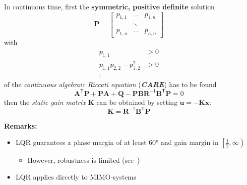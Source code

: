 In continuous time, first the \textbf{symmetric, positive definite} solution
\begin{equation*}
    \mathbf{P}=\begin{bmatrix} p_{1,1} & \dots  & p_{1,n} \\
                        & \ddots &         \\
                p_{1,n} & \dots  & p_{n,n}
    \end{bmatrix}
\end{equation*}
with
\begin{align*}
    p_{1,1}                   & >0 \\
    p_{1,1}p_{2,2} -p_{1,2}^2 & >0 \\
    \vdots
\end{align*}
of the \textit{continuous algebraic Riccati equation} (\textbf{\textit{CARE}}) has to be found
\noindent\begin{equation*}
    \mathbf{A}^{\mathsf{T}} \mathbf{P}+\mathbf{PA}+\mathbf{Q}-\mathbf{PBR}^{-1}\mathbf{B}^{\mathsf{T}} \mathbf{P}=0
\end{equation*}
then the \textit{static gain matrix} $\mathbf{K}$ can be obtained by setting $\mathbf{u} = -\mathbf{Kx}$:
\noindent\begin{equation*}
    \mathbf{K}=\mathbf{R}^{-1}\mathbf{B}^{\mathsf{T}} \mathbf{P}
\end{equation*}

\textbf{Remarks:}

\begin{itemize}
    \item LQR guarantees a phase margin of at least 60° and gain margin in $\left[\frac{1}{2},\infty\right)$
          \begin{itemize}
              \item However, robustness is limited (see\ \cite{539438})
          \end{itemize}
    \item LQR applies directly to MIMO-systems
\end{itemize}

\newpar{}
\textbf{} 


